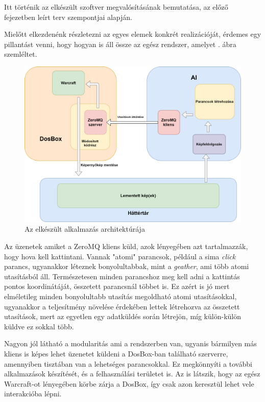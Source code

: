 
Itt történik az elkészült szoftver megvalósításának bemutatása, az előző fejezetben leírt terv szempontjai alapján.


Mielőtt elkezdenénk részletezni az egyes elemek konkrét realizációját, érdemes egy pillantást venni, hogy hogyan is áll össze az egész rendszer, amelyet . ábra szemléltet. 

\begin{figure}[h]
    \centering
    \includegraphics[scale=0.22]{images/architecture.png}
    \caption{Az elkészült alkalmazás architektúrája}
    \label{fig:rect}
\end{figure}

Az üzenetek amiket a ZeroMQ kliens küld, azok lényegében azt tartalmazzák, hogy hova kell kattintani. 
Vannak "atomi" parancsok, például a sima \textit{click} parancs, ugyanakkor léteznek bonyolultabbak, mint a \textit{geather}, ami több atomi utasításból áll. Természetesen minden parancshoz meg kell adni a kattintás pontos koordinátáját, összetett parancsnál többet is. Ez azért is jó mert elméletileg minden bonyolultabb utasítás megoldható atomi utasításokkal, ugyanakkor a teljesítmény növelése érdekében lettek létrehozva az összetett utasítások, mert az egyetlen egy adatküldés során létrejön, míg külön-külön küldve ez sokkal több.

Nagyon jól látható a modularitás ami a rendszerben van, ugyanis bármilyen más kliens is képes lehet üzenetet küldeni a DosBox-ban található szerverre, amennyiben tisztában van a lehetséges parancsokkal. Ez megkönnyíti a további alkalmazások készítését, és a felhasználási területet is. Az is látszik, hogy az egész Warcraft-ot lényegében körbe zárja a DosBox, így csak azon keresztül lehet vele interakcióba lépni. 

